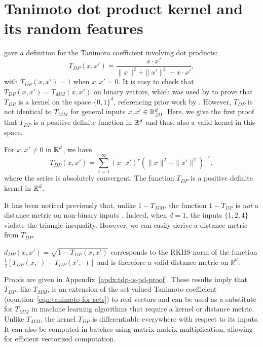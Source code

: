 \section{Tanimoto dot product kernel and its random features}\label{sec:t-dp}

\citet{ralaivola2005graph} gave a definition for the Tanimoto coefficient involving dot products:
\begin{equation}\label{eqn:tanidot-kernel}
    T_{DP}(x, x') = \frac{x\cdot x'}{\|x\|^2+\|x'\|^2-x\cdot x'},
\end{equation}
with $T_{DP}(x,x')=1$ when $x,x'=0$. It is easy to check that $T_{DP}(x,x')=T_{MM}(x,x')$ on binary vectors, which was used by \citet{ralaivola2005graph} to prove that $T_{DP}$ is a kernel on the space $\{0,1\}^d$, referencing prior work by \citet{gower1971general}.  However, $T_{DP}$ is not identical to $T_{MM}$ for general inputs $x,x'\in \mathbb{R}_{\ge 0}^d$. Here, we give the first proof that $T_{DP}$ is a positive definite function in $\mathbb{R}^d$ and thus, also a valid kernel in this space.

\begin{theorem}\label{thm:tdp-is-pd}
    For $x,x'\neq 0$ in $\mathbb{R}^d$, we have
    \begin{equation}\label{eqn:tanidot-power-series}
       T_{DP}(x,x')= \sum_{r=1}^\infty \left(x\cdot x'\right)^r \left(\|x\|^2+\|x'\|^2\right)^{-r},
    \end{equation}
    where the series is absolutely convergent. The function $T_{DP}$ is a positive definite kernel in $\mathbb{R}^d$.
\end{theorem}

It has been noticed previously that, unlike $1-T_{MM}$, the function $1-T_{DP}$ is \emph{not} a distance metric on non-binary inputs \citep{kosub2019note}. Indeed, when $d=1$, the inputs $\{1,2,4\}$   violate the triangle inequality. However, we can easily derive a distance metric from $T_{DP}$.

\begin{corollary}\label{thm:tdp-is-metric}
    $d_{DP}(x,x')=\sqrt{1-T_{DP}(x,x')}$ 
    corresponds to the RKHS norm of the function $\frac{1}{2}[T_{DP}(x,\cdot)-T_{DP}(x',\cdot)]$
    and is therefore a valid distance metric on $\mathbb{R}^d$.
\end{corollary}

Proofs are given in Appendix~\ref{apdx:tdp-is-pd-proof}. These results imply that $T_{DP}$, like $T_{MM}$, is an extension of the set-valued Tanimoto coefficient (equation~\ref{eqn:tanimoto-for-sets})
to real vectors and can be used as a substitute for $T_{MM}$ in machine learning algorithms that require a kernel or distance metric. Unlike $T_{MM}$, the kernel $T_{DP}$
is differentiable everywhere with respect to its inputs.
It can also be computed in batches using matrix-matrix multiplication,
allowing for efficient vectorized computation.

